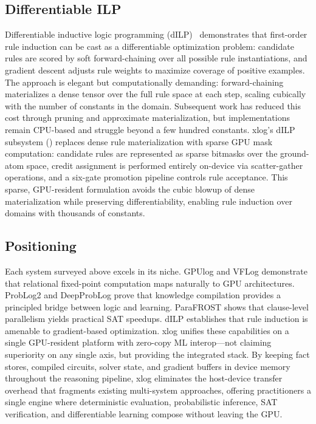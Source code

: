 \subsection{Differentiable ILP}

Differentiable inductive logic programming (dILP)~\cite{dilp} demonstrates that first-order rule induction can be cast as a differentiable optimization problem: candidate rules are scored by soft forward-chaining over all possible rule instantiations, and gradient descent adjusts rule weights to maximize coverage of positive examples. The approach is elegant but computationally demanding: forward-chaining materializes a dense tensor over the full rule space at each step, scaling cubically with the number of constants in the domain. Subsequent work has reduced this cost through pruning and approximate materialization, but implementations remain CPU-based and struggle beyond a few hundred constants. xlog's dILP subsystem () replaces dense rule materialization with sparse GPU mask computation: candidate rules are represented as sparse bitmasks over the ground-atom space, credit assignment is performed entirely on-device via scatter-gather operations, and a six-gate promotion pipeline controls rule acceptance. This sparse, GPU-resident formulation avoids the cubic blowup of dense materialization while preserving differentiability, enabling rule induction over domains with thousands of constants.

\subsection{Positioning}

Each system surveyed above excels in its niche. GPUlog and VFLog demonstrate that relational fixed-point computation maps naturally to GPU architectures. ProbLog2 and DeepProbLog prove that knowledge compilation provides a principled bridge between logic and learning. ParaFROST shows that clause-level parallelism yields practical SAT speedups. dILP establishes that rule induction is amenable to gradient-based optimization. xlog unifies these capabilities on a single GPU-resident platform with zero-copy ML interop---not claiming superiority on any single axis, but providing the integrated stack. By keeping fact stores, compiled circuits, solver state, and gradient buffers in device memory throughout the reasoning pipeline, xlog eliminates the host-device transfer overhead that fragments existing multi-system approaches, offering practitioners a single engine where deterministic evaluation, probabilistic inference, SAT verification, and differentiable learning compose without leaving the GPU.
